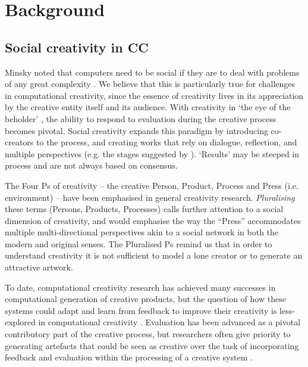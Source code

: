\section{Background}
\label{background}

\subsection{Social creativity in CC}


Minsky noted that computers need to be social if they are to deal with problems of any great complexity \citep{minsky1967programming,society-of-mind}.
We believe that this is particularly true for challenges in computational creativity,
since the essence of creativity lives in its appreciation by the creative entity itself and its audience.
With creativity in `the eye of the beholder' \cite{cardoso09}, the ability to respond to evaluation during the creative process \cite{poincare29,csik88} becomes pivotal. Social creativity expands this
paradigm by introducing co-creators to the process, and creating works
that rely on dialogue, reflection, and multiple perspectives (e.g. the stages suggested by \cite{gervas14}).  `Results' may be steeped in process and are not always based on
consensus.

The Four Ps of creativity -- the creative Person, Product, Process and
Press (i.e. environment) \cite{rhodes61} -- have been
emphasised in general creativity research.  \emph{Pluralising} these
terms (Persons, Products, Processes) calls further attention to a
social dimension of creativity, and would emphasise the way the ``Press'' 
accommodates multiple multi-directional perspectives akin to a social
network in both the modern and original senses. %
The Pluralised Ps remind us that in order to understand creativity it
is not sufficient to model a lone creator or to generate an
attractive artwork.

To date, computational creativity research has achieved many successes in
computational generation of creative products, but the question of how
these systems could adapt and learn from feedback to improve their
creativity is less-explored in computational creativity \cite{jordanous15aisb}.
Evaluation has been advanced as a pivotal contributory part of the creative
process, but researchers often give priority to
generating artefacts that could be seen as creative over
the task of incorporating feedback and evaluation within the
processing of a creative system \cite{jordanous11iccc}.

